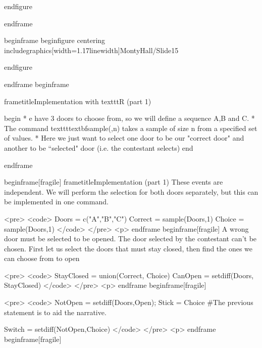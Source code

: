 	end{figure}
	
end{frame}

begin{frame}
	begin{figure}
		centering
		includegraphics[width=1.17linewidth]{MontyHall/Slide15}
		
	end{figure}
	
end{frame}
begin{frame}
	
	frametitle{Implementation with texttt{R} (part 1)}
	
	begin{ }
         * e have 3 doors to choose from, so we will define a sequence A,B and C. 
         * The command texttt{textbf{sample(,n)}} takes a sample of size n from a specified set of values. 
         * Here we just want to select one door to be our "correct door" and another to be ``selected" door (i.e. the contestant selects)
end{ }
	
	
end{frame}

begin{frame}[fragile]
	frametitle{Implementation (part 1)}
	These events are independent. We will perform the selection for both doors separately, but this can be implemented in one command.
	
	
	<pre>
		<code>
		Doors = c("A","B","C")
		Correct = sample(Doors,1)
		Choice = sample(Doors,1)
		</code> 
	</pre>
<p>
end{frame}
begin{frame}[fragile]
	A wrong door must be selected to be opened. The door selected by the contestant can't be chosen. First let us select the doors that must stay closed, then find the ones we can choose from to open
	
	<pre>
		<code>
		StayClosed = union(Correct, Choice)
		CanOpen = setdiff(Doors, StayClosed)
		</code> 
	</pre>
<p>
end{frame}
begin{frame}[fragile]
	
	<pre>
		<code>
		NotOpen = setdiff(Doors,Open); Stick = Choice        
		#The previous statement is to aid the narrative. 
		
		Switch = setdiff(NotOpen,Choice)
		</code> 
	</pre>
<p>
end{frame}
begin{frame}[fragile]
	
